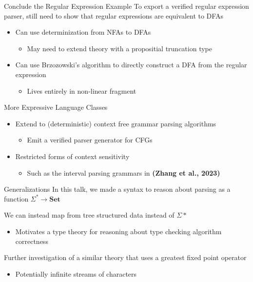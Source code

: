 \documentclass[10pt]{beamer}
\newcommand{\Set}{\mathbf{Set}}
\begin{document}
\begin{frame}{Conclude the Regular Expression Example}
  To export a verified regular expression parser, still need to show that regular expressions are equivalent to DFAs

  \begin{itemize}
    \item Can use determinization from NFAs to DFAs
      \begin{itemize}
        \item May need to extend theory with a propositial truncation type
      \end{itemize}
    \item Can use Brzozowski's algorithm to directly construct a DFA from the regular expression
      \begin{itemize}
        \item Lives entirely in non-linear fragment
      \end{itemize}
  \end{itemize}

\end{frame}

\begin{frame}{More Expressive Language Classes}
  \begin{itemize}
    \item<1-> Extend to (deterministic) context free grammar parsing algorithms
        \begin{itemize}
          \item<2-> Emit a verified parser generator for CFGs
        \end{itemize}
    \item<3-> Restricted forms of context sensitivity
        \begin{itemize}
          \item<4-> Such as the interval parsing grammars in \textbf{(Zhang et al., 2023)}
        \end{itemize}
  \end{itemize}
\end{frame}

\begin{frame}{Generalizations}
  In this talk, we made a syntax to reason about parsing as a function $\Sigma^{*} \to \Set$

  We can instead map from tree structured data instead of $\Sigma*$
  \begin{itemize}
    \item Motivates a type theory for reasoning about type checking algorithm correctness
  \end{itemize}

  Further investigation of a similar theory that uses a greatest fixed point operator
  \begin{itemize}
    \item Potentially infinite streams of characters
  \end{itemize}
\end{frame}
\end{document}
